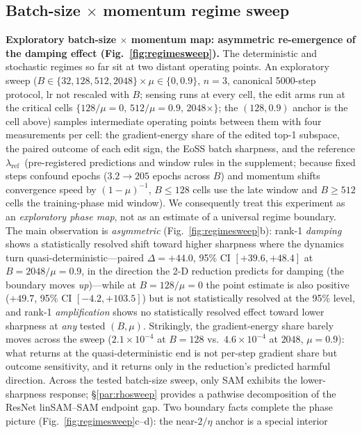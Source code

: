 \documentclass{article}
\theoremstyle{plain}
\theoremstyle{definition}
\theoremstyle{remark}
\newcommand{\lref}{\ensuremath{\lambda_{\mathrm{ref}}}}
\begin{document}
\subsection{Batch-size $\times$ momentum regime sweep}
\textbf{Exploratory batch-size $\times$ momentum map: asymmetric
re-emergence of the damping effect (Fig.~\ref{fig:regimesweep}).} The deterministic and stochastic regimes so
far sit at two distant operating points. An exploratory sweep
($B\in\{32,128,512,2048\}\times\mu\in\{0,0.9\}$, $n{=}3$, canonical
5000-step protocol, lr not rescaled with $B$; sensing runs at every cell,
the edit arms run at the critical cells $\{128/\mu{=}0,\,512/\mu{=}0.9,\,
2048\times\}$; the $(128,0.9)$ anchor is the cell above) samples
intermediate operating points between them with
four measurements per cell: the gradient-energy share of the edited top-1
subspace, the paired outcome of each edit sign, the EoSS batch
sharpness, and the reference \lref\ (pre-registered predictions and
window rules in the supplement; because fixed steps confound epochs
($3.2\!\to\!205$ epochs across $B$) and momentum shifts convergence speed
by $(1-\mu)^{-1}$, $B\!\le\!128$ cells use the late window and $B\!\ge\!512$
cells the training-phase mid window). We consequently treat this
experiment as an \emph{exploratory phase map}, not as an estimate of a
universal regime boundary. The main observation is \emph{asymmetric}
(Fig.~\ref{fig:regimesweep}b): rank-1 \emph{damping} shows a
statistically resolved shift toward higher sharpness where the dynamics
turn quasi-deterministic---paired $\Delta{=}{+}44.0$, 95\% CI
$[{+}39.6,{+}48.4]$ at $B{=}2048/\mu{=}0.9$, in the direction the 2-D
reduction predicts for damping (the boundary moves \emph{up})---while
at $B{=}128/\mu{=}0$ the point estimate is also positive (${+}49.7$,
95\% CI $[{-}4.2,{+}103.5]$) but is not statistically resolved at the
95\% level, and rank-1 \emph{amplification}
shows no statistically resolved effect toward lower sharpness at \emph{any} tested $(B,\mu)$. Strikingly, the
gradient-energy share barely moves across the sweep
($2.1{\times}10^{-4}$ at $B{=}128$ vs.\ $4.6{\times}10^{-4}$ at $2048$,
$\mu{=}0.9$): what returns at the quasi-deterministic end is not per-step
gradient share but outcome sensitivity, and it returns only in the
reduction's predicted harmful direction. Across the tested batch-size
sweep, only SAM exhibits the lower-sharpness response;
\S\ref{par:rhosweep} provides a pathwise decomposition of the ResNet
linSAM--SAM endpoint gap. Two boundary facts complete the phase picture
(Fig.~\ref{fig:regimesweep}c--d): the near-$2/\eta$ anchor is a special interior
\end{document}
